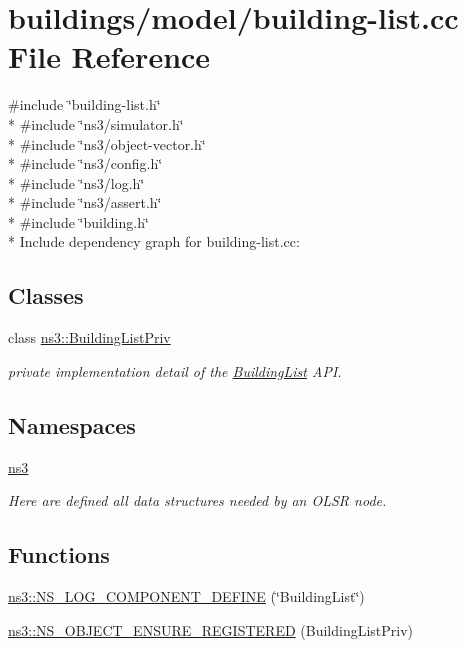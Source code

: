 \hypertarget{building-list_8cc}{}\section{buildings/model/building-\/list.cc File Reference}
\label{building-list_8cc}
{\ttfamily \#include \char`\"{}building-\/list.\+h\char`\"{}}\\*
{\ttfamily \#include \char`\"{}ns3/simulator.\+h\char`\"{}}\\*
{\ttfamily \#include \char`\"{}ns3/object-\/vector.\+h\char`\"{}}\\*
{\ttfamily \#include \char`\"{}ns3/config.\+h\char`\"{}}\\*
{\ttfamily \#include \char`\"{}ns3/log.\+h\char`\"{}}\\*
{\ttfamily \#include \char`\"{}ns3/assert.\+h\char`\"{}}\\*
{\ttfamily \#include \char`\"{}building.\+h\char`\"{}}\\*
Include dependency graph for building-\/list.cc\+:
\subsection*{Classes}
\begin{DoxyCompactItemize}
\item 
class \hyperlink{classns3_1_1BuildingListPriv}{ns3\+::\+Building\+List\+Priv}
\begin{DoxyCompactList}\small\item\em private implementation detail of the \hyperlink{classns3_1_1BuildingList}{Building\+List} A\+PI. \end{DoxyCompactList}\end{DoxyCompactItemize}
\subsection*{Namespaces}
\begin{DoxyCompactItemize}
\item 
 \hyperlink{namespacens3}{ns3}
\begin{DoxyCompactList}\small\item\em Here are defined all data structures needed by an O\+L\+SR node. \end{DoxyCompactList}\end{DoxyCompactItemize}
\subsection*{Functions}
\begin{DoxyCompactItemize}
\item 
\hyperlink{namespacens3_a3071d3b2c721328c2ddb79927ae33df7}{ns3\+::\+N\+S\+\_\+\+L\+O\+G\+\_\+\+C\+O\+M\+P\+O\+N\+E\+N\+T\+\_\+\+D\+E\+F\+I\+NE} (\char`\"{}Building\+List\char`\"{})
\item 
\hyperlink{namespacens3_a7a43ea4d5b45cfd417848d011f3348ef}{ns3\+::\+N\+S\+\_\+\+O\+B\+J\+E\+C\+T\+\_\+\+E\+N\+S\+U\+R\+E\+\_\+\+R\+E\+G\+I\+S\+T\+E\+R\+ED} (Building\+List\+Priv)
\end{DoxyCompactItemize}
